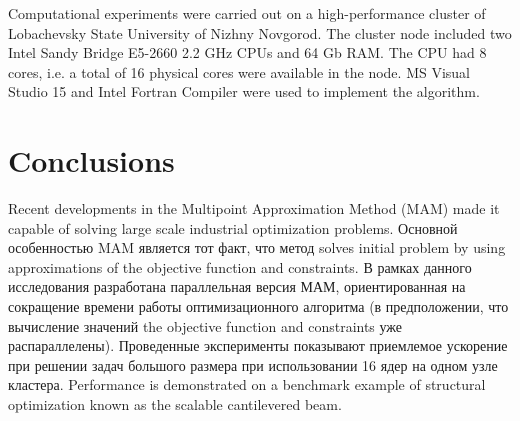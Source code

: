 \documentclass[runningheads,a4paper]{llncs}
\begin{document}
Computational experiments were carried out on a high-performance cluster of Lobachevsky State University of Nizhny Novgorod. The cluster node included two Intel Sandy Bridge E5-2660 2.2 GHz CPUs and 64 Gb RAM. The CPU had 8 cores, i.e. a total of 16 physical cores were available in the node. MS Visual Studio 15 and Intel Fortran Compiler were used to implement the algorithm.

\section{Conclusions}

Recent developments in the Multipoint Approximation Method (MAM) made it capable of solving large scale industrial optimization problems. 
\Russian
Основной особенностью MAM является тот факт, что метод solves initial problem by using approximations of the objective function and constraints. 
В рамках данного исследования разработана параллельная версия МАМ, ориентированная на сокращение времени работы оптимизационного алгоритма (в предположении, что вычисление значений the objective function and constraints уже распараллелены). Проведенные эксперименты показывают приемлемое ускорение при решении задач большого размера при использовании 16 ядер на одном узле кластера. 
Performance is demonstrated on a benchmark example of structural optimization known as the scalable cantilevered beam.  




{}

\end{document}
